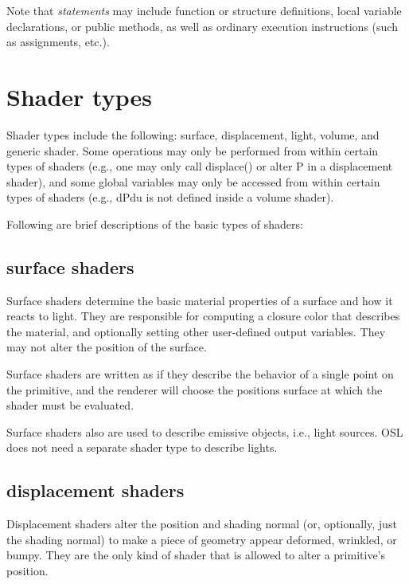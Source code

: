 \documentclass[11pt,letterpaper]{book}
\def\P{{\cf P}\xspace}
\def\colorclosure{{\cf closure color}\xspace}
\begin{document}
Note that \emph{statements} may include function or structure
definitions, local variable declarations, or public methods, as well as
ordinary execution instructions (such as assignments, etc.).

\section{Shader types}
\label{sec:shadertypes}
 

Shader types include the following: {\cf surface}, {\cf displacement},
{\cf light}, {\cf volume}, and generic {\cf shader}.  Some operations
may only be performed from within certain types of shaders (e.g., one
may only call {\cf displace()} or alter \P in a displacement shader),
and some global variables may only be accessed from within certain types
of shaders (e.g., {\cf dPdu} is not defined inside a volume shader).

Following are brief descriptions of the basic types of shaders:


\subsection*{{\cf surface} shaders}

Surface shaders determine the basic material properties of a surface and
how it reacts to light.  They are responsible for computing a
\colorclosure that describes the material, and optionally setting
other user-defined output variables.  They may not alter
the position of the surface.

Surface shaders are written as if they describe the behavior of a single
point on the primitive, and the renderer will choose the positions
surface at which the shader must be evaluated.

Surface shaders also are used to describe emissive objects, i.e., light
sources.  OSL does not need a separate shader type to describe lights.

\subsection*{{\cf displacement} shaders}

Displacement shaders alter the position and shading normal (or,
optionally, just the shading normal) to make a piece of geometry appear
deformed, wrinkled, or bumpy.  They are the only kind of shader that
is allowed to alter a primitive's position.
\end{document}
